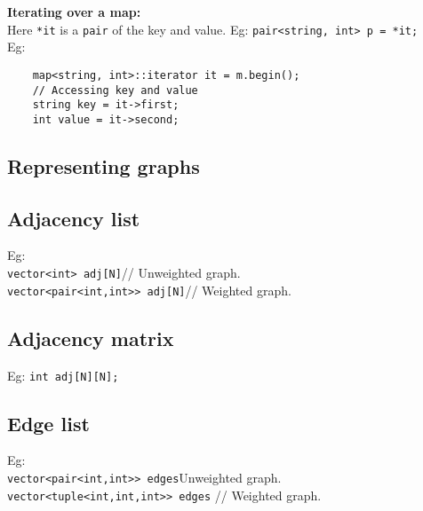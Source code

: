 \begin{minipage}{\linewidth}
\textbf{Iterating over a map:}\\
Here \texttt{*it} is a \texttt{pair} of the key and value.
Eg: \texttt{pair<string, int> p = *it;}\\
Eg:
\begin{verbatim}
    map<string, int>::iterator it = m.begin();
    // Accessing key and value
    string key = it->first;
    int value = it->second;
\end{verbatim}

\subsection{Representing graphs}

\subsection{Adjacency list}
Eg:\\
\texttt{vector<int> adj[N]}// Unweighted graph.\\
\texttt{vector<pair<int,int>> adj[N]}// Weighted graph.\\

\subsection{Adjacency matrix}

Eg: \texttt{int adj[N][N];}

\subsection{Edge list}

Eg:\\
\texttt{vector<pair<int,int>> edges}Unweighted graph.\\
\texttt{vector<tuple<int,int,int>> edges} // Weighted graph.\\

\end{minipage}
